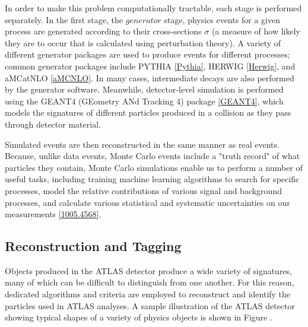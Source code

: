 In order to make this problem computationally tractable, each stage is performed separately. In the first stage, the $generator$ stage, physics events for a given process are generated according to their cross-sections $\sigma$ (a measure of how likely they are to occur that is calculated using perturbation theory). A variety of different generator packages are used to produce events for different processes; common generator packages include PYTHIA \ref{Pythia}, HERWIG \ref{Herwig}, and aMCatNLO \ref{aMCNLO}. In many cases, intermediate decays are also performed by the generator software. Meanwhile, detector-level simulation is performed using the GEANT4 (GEometry ANd Tracking 4) package \ref{GEANT4}, which models the signatures of different particles produced in a collision as they pass through detector material.

Simulated events are then reconstructed in the same manner as real events. Because, unlike data events, Monte Carlo events include a "truth record" of what particles they contain, Monte Carlo simulations enable us to perform a number of useful tasks, including training machine learning algorithms to search for specific processes, model the relative contributions of various signal and background processes, and calculate various statistical and systematic uncertainties on our measurements \ref{1005.4568}.

\subsection{Reconstruction and Tagging} \label{sec:Reco} 

Objects produced in the ATLAS detector produce a wide variety of signatures, many of which can be difficult to distinguish from one another. For this reason, dedicated algorithms and criteria are employed to reconstruct and identify the particles used in ATLAS analyses. A sample illustration of the ATLAS detector showing typical shapes of a variety of physics objects is shown in Figure .

